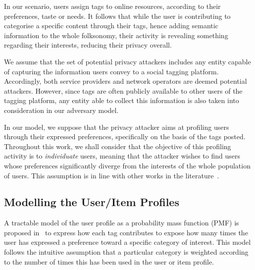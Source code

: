 In our scenario, users assign tags to online resources, according to their preferences, taste or needs. It follows that while the user is contributing to categorise a specific content through their tags, hence adding semantic information to the whole folksonomy, their activity is revealing something regarding their interests, reducing their privacy overall.

We assume that the set of potential privacy attackers includes any entity capable of capturing the information users convey to a social tagging platform. Accordingly, both service providers and network operators are deemed potential attackers. However, since tags are often publicly available to other users of the tagging platform, any entity able to collect this information is also taken into consideration in our adversary model.

In our model, we suppose that the privacy attacker aims at profiling users through their expressed preferences, specifically on the basis of the tags posted. Throughout this work, we shall consider that the objective of this profiling activity is to \emph{individuate} users, meaning that the attacker wishes to find users whose preferences significantly diverge from the interests of the whole population of users. This assumption is in line with other works in the literature~\cite{parra2014measuring,Parra13PhD,parra2014optimal}.

\subsection{Modelling the User/Item Profiles}
\label{sec:mod-profiles}
A tractable model of the user profile as a probability mass function (PMF) is proposed in~\cite{Parra10TB,parra2012optimal,Parra12TKDE,Parra13PhD} to express how each tag contributes to expose how many times the user has expressed a preference toward a specific category of interest. This model follows the intuitive assumption that a particular category is weighted according to the number of times this has been used in the user or item profile.

